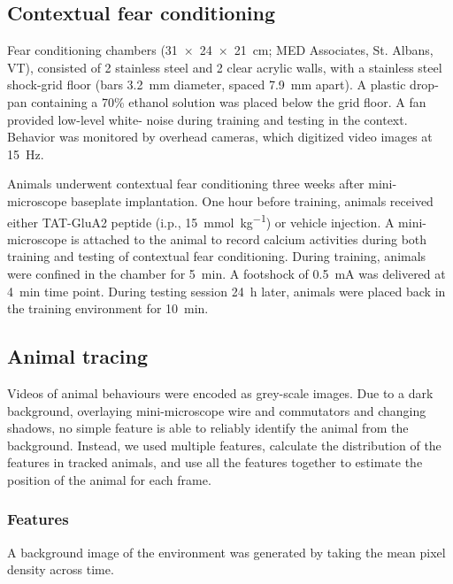 \subsection{Contextual fear conditioning}
Fear conditioning chambers (\SI{31 x 24 x 21}{\cm}; MED Associates, St. Albans, VT), consisted of 2 stainless steel and 2 clear acrylic walls, with a stainless steel shock-grid floor (bars \SI{3.2}{\mm} diameter, spaced \SI{7.9}{\mm} apart). A plastic drop-pan containing a 70\% ethanol solution was placed below the grid floor. A fan provided low-level white- noise during training and testing in the context. Behavior was monitored by overhead cameras, which digitized video images at \SI{15}{\Hz}. 

Animals underwent contextual fear conditioning three weeks after mini-microscope baseplate implantation. One hour before training, animals received either TAT-GluA2 peptide (i.p., \SI{15}{\mmol\per\kg}) or vehicle injection. A mini-microscope is attached to the animal to record calcium activities during both training and testing of contextual fear conditioning. During training, animals were confined in the chamber for \SI{5}{\minute}. A footshock of \SI{0.5}{\mA} was delivered at \SI{4}{\minute} time point. During testing session \SI{24}{\hour} later, animals were placed back in the training environment for \SI{10}{\minute}. 

\subsection{Animal tracing}
Videos of animal behaviours were encoded as grey-scale images. Due to a dark background, overlaying mini-microscope wire and commutators and changing shadows, no simple feature is able to reliably identify the animal from the background. Instead, we used multiple features, calculate the distribution of the features in tracked animals, and use all the features together to estimate the position of the animal for each frame.

\subsubsection{Features}

A background image of the environment was generated by taking the mean pixel density across time. 

